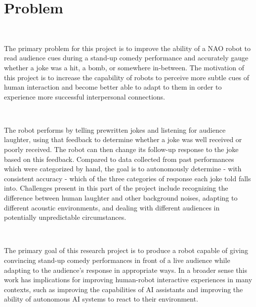 \documentclass[onecolumn, draftclsnofoot,10pt, compsoc]{IEEEtran}
\begin{document}
\section{Problem}
\ \par
\noindent The primary problem for this project is to improve the ability of a NAO robot to read audience cues during a stand-up comedy performance and accurately gauge whether a joke was a hit, a bomb, or somewhere in-between. The motivation of this project is to increase the capability of robots to perceive more subtle cues of human interaction and become better able to adapt to them in order to experience more successful interpersonal connections.\par
\ \par
\noindent The robot performs by telling prewritten jokes and listening for audience laughter, using that feedback to determine whether a joke was well received or poorly received. The robot can then change its follow-up response to the joke based on this feedback. Compared to data collected from past performances which were categorized by hand, the goal is to autonomously determine - with consistent accuracy - which of the three categories of response each joke told falls into. Challenges present in this part of the project include recognizing the difference between human laughter and other background noises, adapting to different acoustic environments, and dealing with different audiences in potentially unpredictable circumstances.\par
\ \par
\noindent The primary goal of this research project is to produce a robot capable of giving convincing stand-up comedy performances in front of a live audience while adapting to the audience's response in appropriate ways. In a broader sense this work has implications for improving human-robot interactive experiences in many contexts, such as improving the capabilities of AI assistants and improving the ability of autonomous AI systems to react to their environment.
\end{document}
